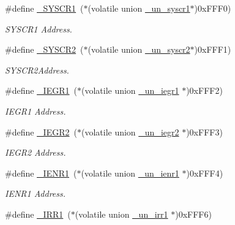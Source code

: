 \begin{DoxyCompactItemize}
\#define \hyperlink{3694s_8h_aeafde033525d62a94985a411074cb114_aeafde033525d62a94985a411074cb114}{\+\_\+\+S\+Y\+S\+C\+R1}~($\ast$(volatile union  \hyperlink{3694s_8h_d0/d8d/union__un__syscr1}{\+\_\+un\+\_\+syscr1}$\ast$)0x\+F\+F\+F0)
\begin{DoxyCompactList}\small\item\em S\+Y\+S\+C\+R1 Address. \end{DoxyCompactList}\item 
\#define \hyperlink{3694s_8h_ab887b3c1a50e47b4945ee50de1988cff_ab887b3c1a50e47b4945ee50de1988cff}{\+\_\+\+S\+Y\+S\+C\+R2}~($\ast$(volatile union  \hyperlink{3694s_8h_d6/d66/union__un__syscr2}{\+\_\+un\+\_\+syscr2}$\ast$)0x\+F\+F\+F1)
\begin{DoxyCompactList}\small\item\em S\+Y\+S\+C\+R2\+Address. \end{DoxyCompactList}\item 
\#define \hyperlink{3694s_8h_a799527df090b9d3512fce86b04206f7b_a799527df090b9d3512fce86b04206f7b}{\+\_\+\+I\+E\+G\+R1}~($\ast$(volatile union  \hyperlink{3694s_8h_dd/d83/union__un__iegr1}{\+\_\+un\+\_\+iegr1} $\ast$)0x\+F\+F\+F2)
\begin{DoxyCompactList}\small\item\em I\+E\+G\+R1 Address. \end{DoxyCompactList}\item 
\#define \hyperlink{3694s_8h_a1f4b45f7c5f5c531d190283bbb9ca33b_a1f4b45f7c5f5c531d190283bbb9ca33b}{\+\_\+\+I\+E\+G\+R2}~($\ast$(volatile union  \hyperlink{3694s_8h_d7/d75/union__un__iegr2}{\+\_\+un\+\_\+iegr2} $\ast$)0x\+F\+F\+F3)
\begin{DoxyCompactList}\small\item\em I\+E\+G\+R2 Address. \end{DoxyCompactList}\item 
\#define \hyperlink{3694s_8h_a529e5ffae60d60f98b2fe6a3eb4f68c3_a529e5ffae60d60f98b2fe6a3eb4f68c3}{\+\_\+\+I\+E\+N\+R1}~($\ast$(volatile union  \hyperlink{3694s_8h_da/de0/union__un__ienr1}{\+\_\+un\+\_\+ienr1} $\ast$)0x\+F\+F\+F4)
\begin{DoxyCompactList}\small\item\em I\+E\+N\+R1 Address. \end{DoxyCompactList}\item 
\#define \hyperlink{3694s_8h_a61a1a835e032f341223be7f06b9a03d5_a61a1a835e032f341223be7f06b9a03d5}{\+\_\+\+I\+R\+R1}~($\ast$(volatile union  \hyperlink{3694s_8h_d4/d69/union__un__irr1}{\+\_\+un\+\_\+irr1}  $\ast$)0x\+F\+F\+F6)

\end{DoxyCompactItemize}
